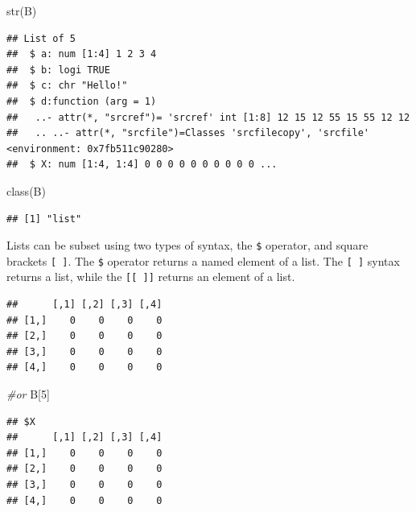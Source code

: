 \documentclass[
]{book}
\newenvironment{Shaded}{\begin{snugshade}}{\end{snugshade}}
\newcommand{\CommentTok}[1]{\textcolor[rgb]{0.56,0.35,0.01}{\textit{#1}}}
\newcommand{\DecValTok}[1]{\textcolor[rgb]{0.00,0.00,0.81}{#1}}
\newcommand{\FunctionTok}[1]{\textcolor[rgb]{0.00,0.00,0.00}{#1}}
\newcommand{\NormalTok}[1]{#1}
\newcommand{\SpecialCharTok}[1]{\textcolor[rgb]{0.00,0.00,0.00}{#1}}
\begin{document}
\begin{Shaded}
\begin{Highlighting}[]
\FunctionTok{str}\NormalTok{(B)}
\end{Highlighting}
\end{Shaded}

\begin{verbatim}
## List of 5
##  $ a: num [1:4] 1 2 3 4
##  $ b: logi TRUE
##  $ c: chr "Hello!"
##  $ d:function (arg = 1)  
##   ..- attr(*, "srcref")= 'srcref' int [1:8] 12 15 12 55 15 55 12 12
##   .. ..- attr(*, "srcfile")=Classes 'srcfilecopy', 'srcfile' <environment: 0x7fb511c90280> 
##  $ X: num [1:4, 1:4] 0 0 0 0 0 0 0 0 0 0 ...
\end{verbatim}

\begin{Shaded}
\begin{Highlighting}[]
\FunctionTok{class}\NormalTok{(B)}
\end{Highlighting}
\end{Shaded}

\begin{verbatim}
## [1] "list"
\end{verbatim}

Lists can be subset using two types of syntax, the \texttt{\$} operator, and square brackets \texttt{{[}\ {]}}. The \texttt{\$} operator returns a named element of a list. The \texttt{{[}\ {]}} syntax returns a list, while the \texttt{{[}{[}\ {]}{]}} returns an element of a list.

\begin{Shaded}
\end{Shaded}

\begin{verbatim}
##      [,1] [,2] [,3] [,4]
## [1,]    0    0    0    0
## [2,]    0    0    0    0
## [3,]    0    0    0    0
## [4,]    0    0    0    0
\end{verbatim}

\begin{Shaded}
\begin{Highlighting}[]
\CommentTok{\#or}
\NormalTok{B[}\DecValTok{5}\NormalTok{]}
\end{Highlighting}
\end{Shaded}

\begin{verbatim}
## $X
##      [,1] [,2] [,3] [,4]
## [1,]    0    0    0    0
## [2,]    0    0    0    0
## [3,]    0    0    0    0
## [4,]    0    0    0    0
\end{verbatim}
\end{document}
